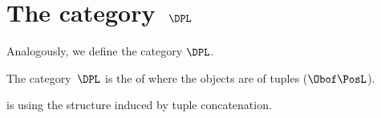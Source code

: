 
\section{The category~$\DPL$}

Analogously, we define the category $\DPL$.

\begin{definition}\label{def:DPL}
    The category~$\DPL$ is the  of \DP where the objects are  of tuples ($\Obof\PosL$).
\end{definition}
\begin{lemma}
    \DPL is  using the structure induced by tuple concatenation.
\end{lemma}
